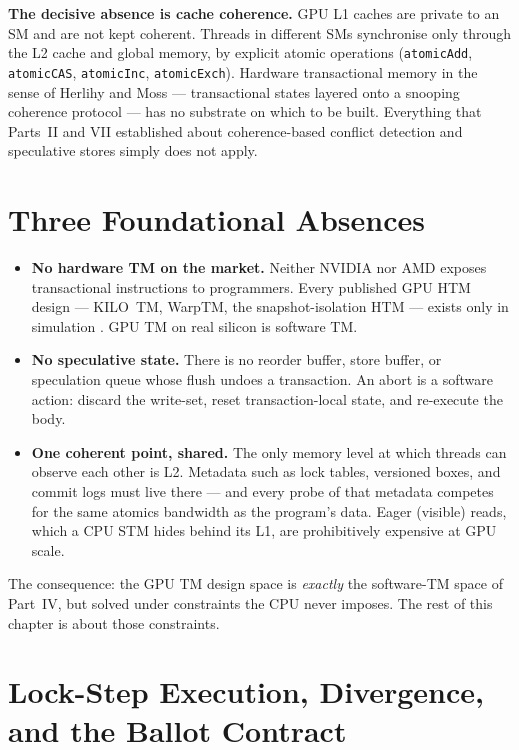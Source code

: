 \textbf{The decisive absence is cache coherence.} GPU L1 caches are private
to an SM and are not kept coherent. Threads in different SMs synchronise only
through the L2 cache and global memory, by explicit atomic operations
(\texttt{atomicAdd}, \texttt{atomicCAS}, \texttt{atomicInc},
\texttt{atomicExch}). Hardware transactional memory in the sense of Herlihy
and Moss --- transactional states layered onto a snooping coherence protocol
\cite{herlihy93} --- has no substrate on which to be built. Everything that
Parts~II and VII established about coherence-based conflict detection and
speculative stores simply does not apply.

\section{Three Foundational Absences}

\begin{itemize}
    \item \textbf{No hardware TM on the market.} Neither NVIDIA nor AMD
          exposes transactional instructions to programmers. Every published
          GPU HTM design --- KILO~TM, WarpTM, the snapshot-isolation HTM ---
          exists only in simulation
          \cite{fung11kilotm,fung13warptm,chen17snapshot}. GPU TM on real
          silicon is software TM.
    \item \textbf{No speculative state.} There is no reorder buffer, store
          buffer, or speculation queue whose flush undoes a transaction. An
          abort is a software action: discard the write-set, reset
          transaction-local state, and re-execute the body.
    \item \textbf{One coherent point, shared.} The only memory level at which
          threads can observe each other is L2. Metadata such as lock tables,
          versioned boxes, and commit logs must live there --- and every probe
          of that metadata competes for the same atomics bandwidth as the
          program's data. Eager (visible) reads, which a CPU STM hides behind
          its L1, are prohibitively expensive at GPU scale.
\end{itemize}

The consequence: the GPU TM design space is \emph{exactly} the software-TM
space of Part~IV, but solved under constraints the CPU never imposes. The
rest of this chapter is about those constraints.

\section{Lock-Step Execution, Divergence, and the Ballot Contract}
\label{sec:ballot}

